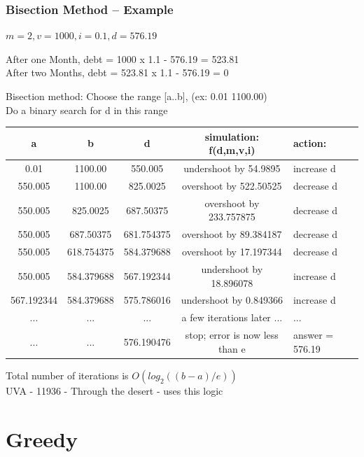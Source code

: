 \documentclass{beamer}
\begin{document}
\begin{frame}
  \frametitle{Bisection Method -- Example}
{\smaller
\begin{block}{}
$m = 2, v = 1000, i = 0.1, d = 576.19$

\medskip

After one Month, debt = 1000 x 1.1 - 576.19 = 523.81\\
After two Months, debt = 523.81 x 1.1 - 576.19 = 0
\end{block}

Bisection method: Choose the range [a..b], (ex: 0.01 1100.00)\\
Do a binary search for d in this range
}

\medskip

{\tiny
\begin{tabular}{c|c|c|c|l}
 a & b & d & simulation: f(d,m,v,i) & action: \\
 \hline
 0.01 & 1100.00 & 550.005 & undershoot by 54.9895 & increase d\\
 550.005 & 1100.00 & 825.0025 & overshoot by 522.50525 & decrease d\\
 550.005 & 825.0025 & 687.50375 & overshoot by 233.757875 & decrease d\\
 550.005 & 687.50375 & 681.754375 & overshoot by 89.384187 & decrease d\\
 550.005 & 618.754375 & 584.379688 & overshoot by 17.197344 & decrease d\\
 550.005 & 584.379688 & 567.192344 & undershoot by 18.896078 & increase d\\
 567.192344 & 584.379688 & 575.786016 & undershoot by 0.849366 & increase d\\
 ... & ... & ... & a few iterations later ... & ...\\
 ... & ... & 576.190476 & stop; error is now less than e & answer = 576.19\\
\end{tabular}
}

\medskip

{\smaller
Total number of iterations is $O(log_2((b-a)/e))$\\
UVA - 11936 - Through the desert - uses this logic}
\end{frame}

\section{Greedy}
\end{document}
